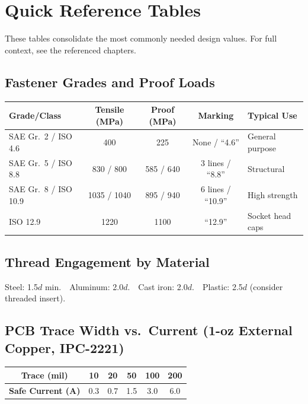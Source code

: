 \chapter*{Quick Reference Tables}

These tables consolidate the most commonly needed design values. For full context, see the referenced chapters.

\section*{Fastener Grades and Proof Loads}
\begin{table}[htbp]\centering\small
\begin{tabularx}{\textwidth}{l c c c l}
\toprule
\textbf{Grade/Class} & \textbf{Tensile (MPa)} & \textbf{Proof (MPa)} & \textbf{Marking} & \textbf{Typical Use} \\
\midrule
SAE Gr.~2 / ISO 4.6 & 400 & 225 & None / ``4.6'' & General purpose \\
SAE Gr.~5 / ISO 8.8 & 830 / 800 & 585 / 640 & 3 lines / ``8.8'' & Structural \\
SAE Gr.~8 / ISO 10.9 & 1035 / 1040 & 895 / 940 & 6 lines / ``10.9'' & High strength \\
ISO 12.9 & 1220 & 1100 & ``12.9'' & Socket head caps \\
\bottomrule
\end{tabularx}
\end{table}

\section*{Thread Engagement by Material}
Steel: 1.5$d$ min.\ \ Aluminum: 2.0$d$.\ \ Cast iron: 2.0$d$.\ \ Plastic: 2.5$d$ (consider threaded insert).

\section*{PCB Trace Width vs.\ Current (1-oz External Copper, IPC-2221)}
\begin{table}[htbp]\centering\small
\begin{tabularx}{\textwidth}{c c c c c c}
\toprule
\textbf{Trace (mil)} & 10 & 20 & 50 & 100 & 200 \\
\midrule
\textbf{Safe Current (A)} & 0.3 & 0.7 & 1.5 & 3.0 & 6.0 \\
\bottomrule
\end{tabularx}
\end{table}

